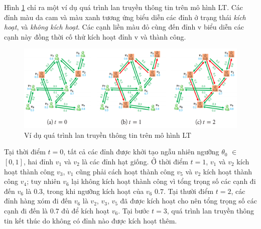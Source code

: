 	Hình \ref{refhinh2_2} chỉ ra một ví dụ quá trình lan truyền thông tin trên mô hình LT. Các đỉnh màu da cam và màu xanh tương ứng biểu diễn các đỉnh ở trạng thái {\itshape kích hoạt}, và {\itshape không kích hoạt}. Các cạnh liền màu đỏ cùng đến đỉnh v biểu diễn các cạnh này đồng thời cố thử kích hoạt đỉnh v và thành công.
	
	\begin{center}
		\begin{figure}[H]
			\begin{center}
				\includegraphics [scale=1]{picture/Hinh2_2}
			\end{center}
			\caption{Ví dụ quá trình lan truyền thông tin trên mô hình LT}
			\label{refhinh2_2}
		\end{figure}
	\end{center}
	
	Tại thời điểm $t$$=$$0$, tất cả các đỉnh được khởi tạo ngẫu nhiên ngưỡng $\theta$$_{0}$ $\in$ $[0,1]$, hai đỉnh $v$$_{1}$ và $v$$_{2}$ là các đỉnh hạt giống. Ở thời điểm $t = 1$, $v$$_{1}$ và $v$$_{2}$ kích hoạt thành công $v$$_{3}$, $v$$_{1}$ cũng phải cách hoạt thành công $v$$_{5}$ và $v$$_{2}$ kích hoạt thành công $v$$_{4}$; tuy nhiên $v$$_{6}$ lại không kích hoạt thành công vì tổng trọng số các cạnh đi đến $v$$_{6}$ là $0.3$, trong khi ngưỡng kích hoạt của $v$$_{6}$ $0.7$. Tại thười điểm $t = 2$, các đỉnh hàng xóm đi đến $v$$_{6}$ là $v$$_{2}$, $v$$_{3}$, $v$$_{5}$ đã được kích hoạt cho nên tổng trọng số các cạnh đi đến là $0.7$ đủ để kích hoạt $v$$_{6}$. Tại bước $t = 3$, quá trình lan truyền thông tin kết thúc do không có đỉnh nào được kích hoạt thêm.

